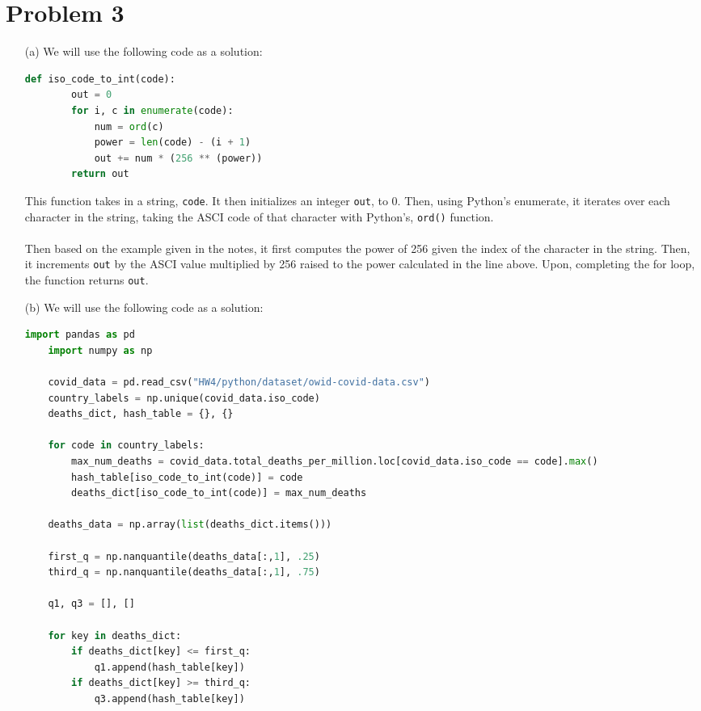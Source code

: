 \documentclass[12pt, letterpaper]{article}
\begin{document}
\section*{Problem 3}
\begin{enumerate}
    \item [(a)] We will use the following code as a solution:
\begin{lstlisting}[language=python]
    def iso_code_to_int(code):
        out = 0
        for i, c in enumerate(code):
            num = ord(c)
            power = len(code) - (i + 1)
            out += num * (256 ** (power))
        return out
\end{lstlisting}
    This function takes in a string, \texttt{code}. It then initializes an integer \texttt{out}, to 0. 
    Then, using Python's enumerate, it iterates over each character in the string, taking the ASCI code 
    of that character with Python's, \texttt{ord()} function. \\ \\
    Then based on the example given in the notes, it first computes the power of 256 
    given the index of the character in the string. Then, it increments \texttt{out} by the ASCI value 
    multiplied by 256 raised to the power calculated in the line above. Upon, completing the for loop, 
    the function returns \texttt{out}.
    \newpage
    \item [(b)] We will use the following code as a solution:
\begin{lstlisting}[language=python]
    import pandas as pd
    import numpy as np

    covid_data = pd.read_csv("HW4/python/dataset/owid-covid-data.csv")
    country_labels = np.unique(covid_data.iso_code)
    deaths_dict, hash_table = {}, {}

    for code in country_labels:
        max_num_deaths = covid_data.total_deaths_per_million.loc[covid_data.iso_code == code].max()
        hash_table[iso_code_to_int(code)] = code
        deaths_dict[iso_code_to_int(code)] = max_num_deaths

    deaths_data = np.array(list(deaths_dict.items()))

    first_q = np.nanquantile(deaths_data[:,1], .25)
    third_q = np.nanquantile(deaths_data[:,1], .75)

    q1, q3 = [], []

    for key in deaths_dict:
        if deaths_dict[key] <= first_q:
            q1.append(hash_table[key])
        if deaths_dict[key] >= third_q:
            q3.append(hash_table[key])


\end{lstlisting}
\end{enumerate}
\end{document}
